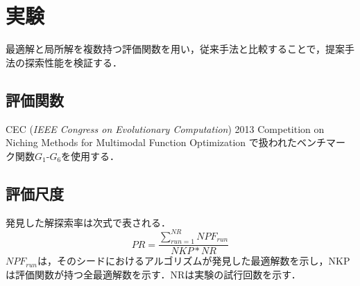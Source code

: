 \documentclass[twocolumn, a4paper]{UECIEresume}
\begin{document}


\section{実験}
最適解と局所解を複数持つ評価関数を用い，従来手法と比較することで，提案手法の探索性能を検証する．
\subsection{評価関数}
CEC ({\it IEEE Congress on Evolutionary Computation}) 2013 Competition on Niching Methods for Multimodal Function Optimization \cite{CEC2013} で扱われたベンチマーク関数$G_1$-$G_6$を使用する．

\subsection{評価尺度}
発見した解探索率は次式で表される．
\begin{equation}
\label{eq:PR}
PR=\frac{\sum_{run=1}^{NR}NPF_{run}}{NKP*NR}
\end{equation}
$NPF_{run}$は，そのシードにおけるアルゴリズムが発見した最適解数を示し，NKPは評価関数が持つ全最適解数を示す．NRは実験の試行回数を示す．
\end{document}
